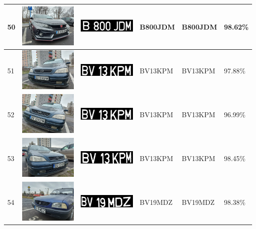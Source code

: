 \documentclass[a4paper,12pt]{report}
\begin{document}
\begin{longtable}{| m{0.6cm} | m{3cm} | m{3cm} | m{1.8cm} | m{1.8cm} | m{1.8cm} |}
        50 & \includegraphics[width=3cm,keepaspectratio]{dataset/28_s1.jpg} & \includegraphics[width=3cm,keepaspectratio]{segmentari/50.jpg} & B800JDM & B800JDM & 98.62\% \\ \hline
        51 & \includegraphics[width=3cm,keepaspectratio]{dataset/29_d1.jpg} & \includegraphics[width=3cm,keepaspectratio]{segmentari/51.jpg} & BV13KPM & BV13KPM & 97.88\% \\ \hline
        52 & \includegraphics[width=3cm,keepaspectratio]{dataset/29_d2.jpg} & \includegraphics[width=3cm,keepaspectratio]{segmentari/52.jpg} & BV13KPM & BV13KPM & 96.99\% \\ \hline
        53 & \includegraphics[width=3cm,keepaspectratio]{dataset/29_s1.jpg} & \includegraphics[width=3cm,keepaspectratio]{segmentari/53.jpg} & BV13KPM & BV13KPM & 98.45\% \\ \hline
        54 & \includegraphics[width=3cm,keepaspectratio]{dataset/30_d1.jpg} & \includegraphics[width=3cm,keepaspectratio]{segmentari/54.jpg} & BV19MDZ & BV19MDZ & 98.38\% \\ \hline

\end{longtable}
\end{document}
